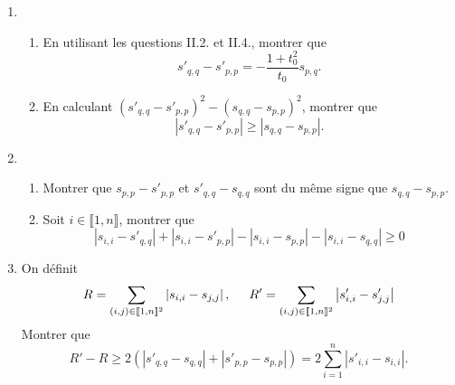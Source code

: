 \begin{enumerate}
 \item 
\begin{enumerate}
 \item En utilisant les questions II.2. et II.4., montrer que 
\begin{displaymath}
 s'_{q,q} - s'_{p,p} = - \frac{1+t_0^2}{t_0} s_{p,q}.
\end{displaymath}
 \item En calculant $(s'_{q,q}-s'_{p,p})^2 - (s_{q,q}-s_{p,p})^2$, montrer que 
\begin{displaymath}
 \left|s'_{q,q}-s'_{p,p}\right| \geq \left|s_{q,q}-s_{p,p}\right|.
\end{displaymath}
\end{enumerate}

 \item 
\begin{enumerate}
 \item Montrer que $s_{p,p}-s'_{p,p}$ et $s'_{q,q}-s_{q,q}$ sont du même signe que $s_{q,q}-s_{p,p}$.
 \item Soit $i\in \llbracket 1,n \rrbracket$, montrer que 
\begin{displaymath}
 \left|s_{i,i} - s'_{q,q}\right| + \left|s_{i,i} - s'_{p,p}\right| - \left|s_{i,i} - s_{p,p}\right| - \left|s_{i,i} - s_{q,q}\right| \geq 0  
\end{displaymath}
\end{enumerate}

 \item On définit
\begin{displaymath}
R = \sum_{(i,j)\in \llbracket 1,n \rrbracket^2} \left|s_{i,i} - s_{j,j}\right|, \hspace{0.5cm}
R' = \sum_{(i,j)\in \llbracket 1,n \rrbracket^2} \left|s'_{i,i} - s'_{j,j}\right|
\end{displaymath}
Montrer que 
\begin{displaymath}
 R' - R \geq 2\left( \left|s'_{q,q} - s_{q,q}\right| + \left|s'_{p,p} - s_{p,p}\right|\right)
 = 2\sum_{i=1}^{n}\left|s'_{i,i} - s_{i,i}\right|.
\end{displaymath}

\end{enumerate}

